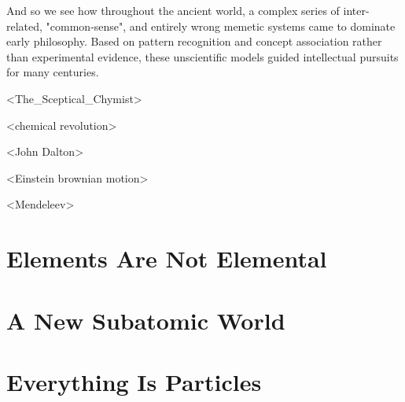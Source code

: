 And so we see how throughout the ancient world, a complex series of inter-related, "common-sense", and entirely wrong memetic systems came to dominate early philosophy. Based on pattern recognition and concept association rather than experimental evidence, these unscientific models guided intellectual pursuits for many centuries.

<The_Sceptical_Chymist>

<chemical revolution>

<John Dalton>

<Einstein brownian motion>

<Mendeleev>

\section{Elements Are Not Elemental}

\section{A New Subatomic World}

\section{Everything Is Particles}